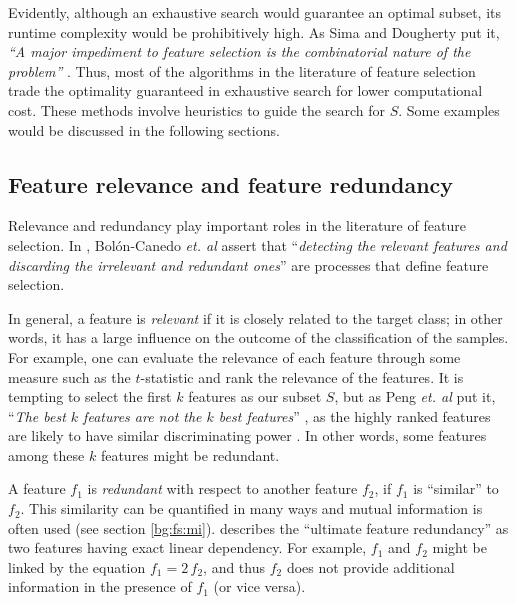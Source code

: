 \documentclass[12pt, twoside, a4paper]{report}
\begin{document}
Evidently, although an exhaustive search would guarantee an optimal subset, its runtime complexity would be prohibitively high. As Sima and Dougherty put it, \textit{``A major impediment to feature selection is the combinatorial nature of the problem''} \cite{RefWorks:191}. Thus, most of the algorithms in the literature of feature selection trade the optimality guaranteed in exhaustive search for lower computational cost. These methods involve heuristics to guide the search for $S$. Some examples would be discussed in the following sections.

\subsection{Feature relevance and feature redundancy} \label{bg:fs:relevance}

Relevance and redundancy play important roles in the literature of feature selection. In \cite{RefWorks:163}, Bolón-Canedo \textit{et. al} assert that ``\textit{detecting the relevant features and discarding the irrelevant and redundant ones}'' are processes that define feature selection.

In general, a feature is \textit{relevant} if it is closely related to the target class; in other words, it has a large influence on the outcome of the classification of the samples. For example, one can evaluate the relevance of each feature through some measure such as the $t$-statistic and rank the relevance of the features. It is tempting to select the first $k$ features as our subset $S$, but as Peng \textit{et. al} put it, ``\textit{The best $k$ features are not the $k$ best features}'' \cite{RefWorks:182}, as the highly ranked features are likely to have similar discriminating power \cite{RefWorks:163}. In other words, some features among these $k$ features might be redundant.

A feature $f_1$ is \textit{redundant} with respect to another feature $f_2$, if $f_1$ is ``similar'' to $f_2$. This similarity can be quantified in many ways and mutual information is often used (see section \ref{bg:fs:mi}). \cite{RefWorks:187} describes the ``ultimate feature redundancy'' as two features having exact linear dependency. For example, $f_1$ and $f_2$ might be linked by the equation $f_1 = 2 \, f_2$, and thus $f_2$ does not provide additional information in the presence of $f_1$ (or vice versa).

\end{document}
